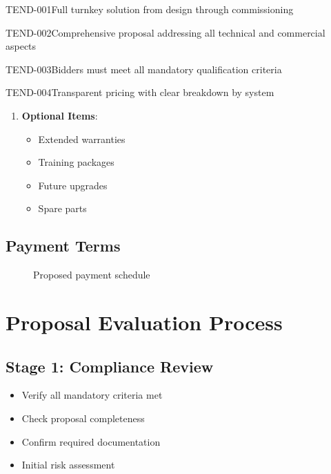 \begin{requirement}{TEND-001}{Full turnkey solution from design through commissioning}
\begin{requirement}{TEND-002}{Comprehensive proposal addressing all technical and commercial aspects}
\begin{requirement}{TEND-003}{Bidders must meet all mandatory qualification criteria}
\begin{requirement}{TEND-004}{Transparent pricing with clear breakdown by system}
\begin{enumerate}
    \item \textbf{Optional Items}:
        \begin{itemize}
            \item Extended warranties
            \item Training packages
            \item Future upgrades
            \item Spare parts
        \end{itemize}
\end{enumerate}

\subsection{Payment Terms}

\begin{figure}[H]
\centering
{}
\caption{Proposed payment schedule}
\end{figure}

\section{Proposal Evaluation Process}

\subsection{Stage 1: Compliance Review}

\begin{itemize}
    \item Verify all mandatory criteria met
    \item Check proposal completeness
    \item Confirm required documentation
    \item Initial risk assessment
\end{itemize}


\end{requirement}
\end{requirement}
\end{requirement}
\end{requirement}
